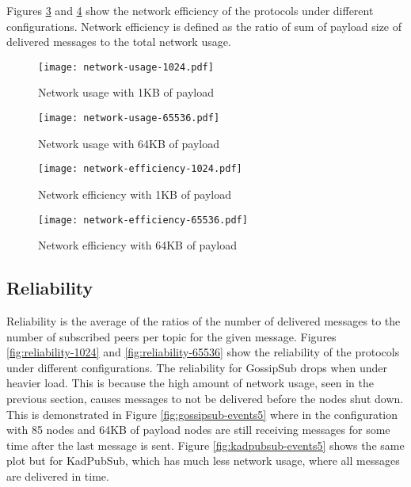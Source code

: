 \documentclass[sigconf]{acmart}
\begin{document}
Figures \ref{fig:network-efficiency-1024} and \ref{fig:network-efficiency-65536} show the network efficiency of the protocols under different configurations.
Network efficiency is defined as the ratio of sum of payload size of delivered messages to the total network usage.

\begin{figure}[htp]
    \centering
    \texttt{[image: network-usage-1024.pdf]}
    \caption{Network usage with 1KB of payload}
    \label{fig:network-usage-1024}
\end{figure}

\begin{figure}[htp]
    \centering
    \texttt{[image: network-usage-65536.pdf]}
    \caption{Network usage with 64KB of payload}
    \label{fig:network-usage-65536}
\end{figure}

\begin{figure}[htp]
    \centering
    \texttt{[image: network-efficiency-1024.pdf]}
    \caption{Network efficiency with 1KB of payload}
    \label{fig:network-efficiency-1024}
\end{figure}

\begin{figure}[htp]
    \centering
    \texttt{[image: network-efficiency-65536.pdf]}
    \caption{Network efficiency with 64KB of payload}
    \label{fig:network-efficiency-65536}
\end{figure}

\subsection{Reliability}
Reliability is the average of the ratios of the number of delivered messages to the number of subscribed peers per topic for the given message.
Figures \ref{fig:reliability-1024} and \ref{fig:reliability-65536} show the reliability of the protocols under different configurations.
The reliability for GossipSub drops when under heavier load. This is because the high amount of network usage, seen in the previous section, causes messages to not be delivered before the nodes shut down. This is demonstrated in Figure \ref{fig:gossipsub-events5} where in the configuration with 85 nodes and 64KB of payload nodes are still receiving messages for some time after the last message is sent. Figure \ref{fig:kadpubsub-events5} shows the same plot but for KadPubSub, which has much less network usage, where all messages are delivered in time.
\end{document}
